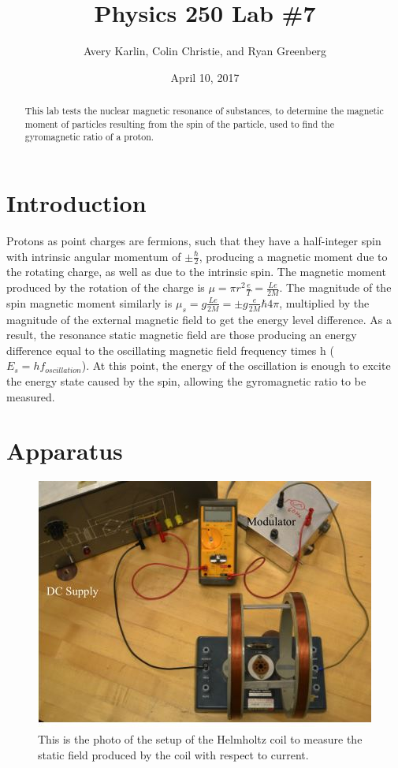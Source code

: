 \documentclass[11pt]{article}
\title{Physics 250 Lab \#7}
\author{Avery Karlin, Colin Christie, and Ryan Greenberg}
\date{April 10, 2017}
\begin{document}
\maketitle
\begin{abstract} This lab tests the nuclear magnetic resonance of substances, to determine the magnetic moment of particles resulting from the spin of the particle, used to find the gyromagnetic ratio of a proton.
\end{abstract}

\section{Introduction}
Protons as point charges are fermions, such that they have a half-integer spin with intrinsic angular momentum of $\pm \frac{\hbar}{2}$, producing a magnetic moment due to the rotating charge, as well as due to the intrinsic spin. The magnetic moment produced by the rotation of the charge is $\mu = \pi r^2 \frac{e}{T} = \frac{Le}{2M}$. The magnitude of the spin magnetic moment similarly is $\mu_s = g\frac{Le}{2M} = \pm g \frac{e}{2M}{\hbar}{4\pi}$, multiplied by the magnitude of the external magnetic field to get the energy level difference. As a result, the resonance static magnetic field are those producing an energy difference equal to the oscillating magnetic field frequency times h ($E_s = hf_{oscillation}$). At this point, the energy of the oscillation is enough to excite the energy state caused by the spin, allowing the gyromagnetic ratio to be measured.

\section{Apparatus}



\begin{figure}[h]
\begin{center}
\includegraphics[scale=0.4]{lab8.jpg}
\caption{This is the photo of the setup of the Helmholtz coil to measure the static field produced by the coil with respect to current.}
\label{equip}
\end{center}
\end{figure}
\end{document}
